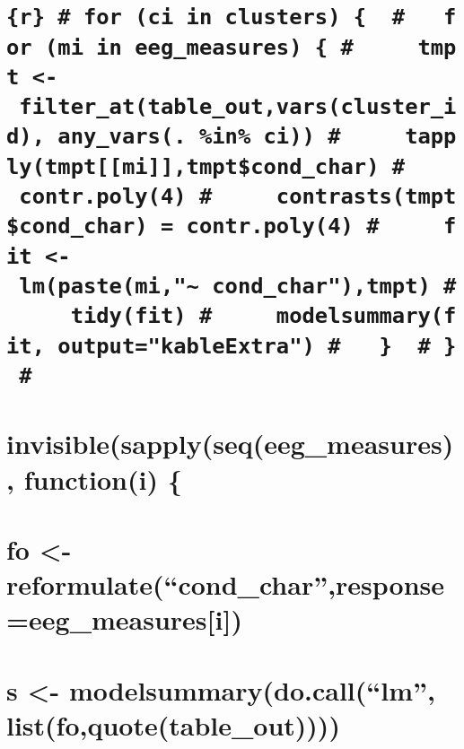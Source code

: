 \documentclass[
]{article}
\begin{document}
\hypertarget{r-for-ci-in-clusters-for-mi-in-eeg_measures-tmpt---filter_attable_outvarscluster_id-any_vars.-in-ci-tapplytmptmitmptcond_char-contr.poly4-contraststmptcond_char-contr.poly4-fit---lmpastemi-cond_chartmpt-tidyfit-modelsummaryfit-outputkableextra}{%
\section{\texorpdfstring{\texttt{\{r\}\ \#\ for\ (ci\ in\ clusters)\ \{\ \ \#\ \ \ for\ (mi\ in\ eeg\_measures)\ \{\ \#\ \ \ \ \ tmpt\ \textless{}-\ filter\_at(table\_out,vars(\textquotesingle{}cluster\_id\textquotesingle{}),\ any\_vars(.\ \%in\%\ ci))\ \#\ \ \ \ \ tapply(tmpt{[}{[}mi{]}{]},tmpt\$cond\_char)\ \#\ \ \ \ \ contr.poly(4)\ \#\ \ \ \ \ contrasts(tmpt\$cond\_char)\ =\ contr.poly(4)\ \#\ \ \ \ \ fit\ \textless{}-\ lm(paste(mi,"\textasciitilde{}\ cond\_char"),tmpt)\ \#\ \ \ \ \ tidy(fit)\ \#\ \ \ \ \ modelsummary(fit,\ output="kableExtra")\ \#\ \ \ \}\ \ \#\ \}\ \#}}{\{r\} \# for (ci in clusters) \{  \#   for (mi in eeg\_measures) \{ \#     tmpt \textless- filter\_at(table\_out,vars(\textquotesingle cluster\_id\textquotesingle), any\_vars(. \%in\% ci)) \#     tapply(tmpt{[}{[}mi{]}{]},tmpt\$cond\_char) \#     contr.poly(4) \#     contrasts(tmpt\$cond\_char) = contr.poly(4) \#     fit \textless- lm(paste(mi,"\textasciitilde{} cond\_char"),tmpt) \#     tidy(fit) \#     modelsummary(fit, output="kableExtra") \#   \}  \# \} \#}}\label{r-for-ci-in-clusters-for-mi-in-eeg_measures-tmpt---filter_attable_outvarscluster_id-any_vars.-in-ci-tapplytmptmitmptcond_char-contr.poly4-contraststmptcond_char-contr.poly4-fit---lmpastemi-cond_chartmpt-tidyfit-modelsummaryfit-outputkableextra}}

\hypertarget{invisiblesapplyseqeeg_measures-functioni}{%
\section{invisible(sapply(seq(eeg\_measures), function(i)
\{}\label{invisiblesapplyseqeeg_measures-functioni}}

\hypertarget{fo---reformulatecond_charresponseeeg_measuresi}{%
\section{fo \textless-
reformulate(``cond\_char'',response=eeg\_measures{[}i{]})}\label{fo---reformulatecond_charresponseeeg_measuresi}}

\hypertarget{s---modelsummarydo.calllm-listfoquotetable_out}{%
\section{s \textless- modelsummary(do.call(``lm'',
list(fo,quote(table\_out))))}\label{s---modelsummarydo.calllm-listfoquotetable_out}}
\end{document}
